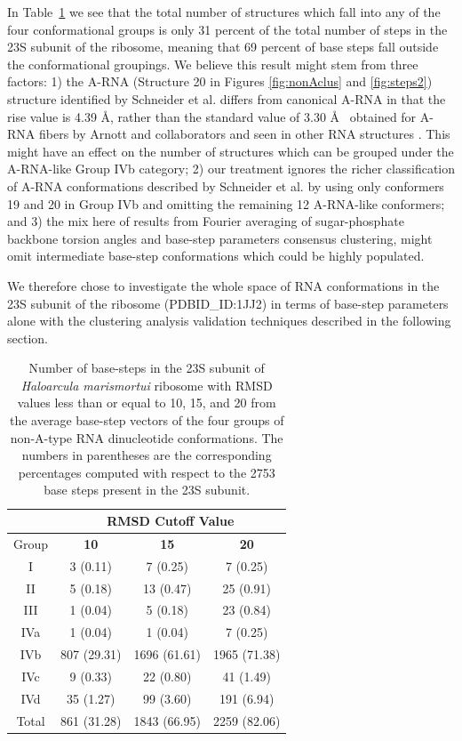 In  Table~\ref{tab:nonA} we see  that the  total number  of structures
which  fall into  any of  the four  conformational groups  is  only 31
percent  of the  total  number of  steps  in the  23S  subunit of  the
ribosome,  meaning that  69 percent  of  base steps  fall outside  the
conformational groupings. We believe this result might stem from three
factors: 1) the A-RNA  (Structure 20 in Figures \ref{fig:nonAclus} and
\ref{fig:steps2})  structure identified by  Schneider et  al.  differs
from canonical A-RNA  in that the rise value is  4.39 \AA, rather than
the standard  value of 3.30 \AA~  obtained for A-RNA  fibers by Arnott
and collaborators  \cite{arnott1973} and seen in  other RNA structures
\cite{chadrasekar1989}.  This  might have an  effect on the  number of
structures  which  can  be  grouped  under the  A-RNA-like  Group  IVb
category; 2) our treatment  ignores the richer classification of A-RNA
conformations described  by Schneider et  al.  \cite{schneider2004} by
using  only  conformers  19 and  20  in  Group  IVb and  omitting  the
remaining 12  A-RNA-like conformers;  and 3) the  mix here  of results
from Fourier averaging of  sugar-phosphate backbone torsion angles and
base-step  parameters consensus  clustering,  might omit  intermediate
base-step conformations which could be highly populated.

We therefore chose to investigate the whole space of RNA conformations
in  the 23S  subunit  of  the ribosome  (PDBID\_ID:1JJ2)  in terms  of
base-step  parameters alone  with the  clustering  analysis validation
techniques described in the following section.

\begin{table}[htbp]
\begin{center}
{\footnotesize
\begin{tabular}{c|c|c|c}
\hline
 & \multicolumn{3}{c}{\bf{RMSD Cutoff Value}}\\ \hline
Group   & \bf{10} & \bf{15} & \bf{20}\\ \hline
I & 3 (0.11) & 7 (0.25) & 7 (0.25)\\ \hline
II & 5 (0.18) & 13 (0.47) & 25 (0.91)\\ \hline
III & 1 (0.04) & 5 (0.18) & 23 (0.84)\\ \hline
IVa & 1 (0.04) & 1 (0.04) & 7 (0.25)\\ \hline
IVb & 807 (29.31) & 1696 (61.61) & 1965 (71.38)\\ \hline
IVc & 9 (0.33) & 22 (0.80) & 41 (1.49)\\ \hline
IVd & 35 (1.27) & 99 (3.60) & 191 (6.94)\\ \hline \hline
Total & 861 (31.28) & 1843 (66.95) & 2259 (82.06)\\ \hline
\end{tabular}
}
\caption{Number of base-steps in the 23S subunit of \textit{Haloarcula
marismortui} ribosome with  RMSD values less than or  equal to 10, 15,
and  20 from  the  average base-step  vectors  of the  four groups  of
non-A-type RNA dinucleotide  conformations. The numbers in parentheses
are the  corresponding percentages computed  with respect to  the 2753
base steps present in the 23S subunit.}
\label{tab:nonA}
\end{center}
\end{table}

